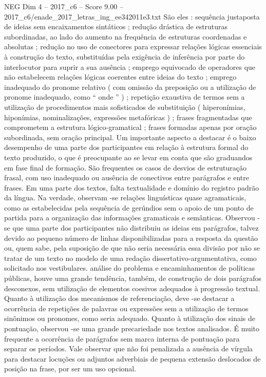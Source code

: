 \begin{textsample}{NEG Dim 4 – 2017\_c6 – Score 9.00 – 2017\_c6/enade\_2017\_letras\_ing\_ee342011e3.txt}
São eles : sequência justaposta de ideias sem encaixamentos sintáticos ; redução drástica de estruturas subordinadas, ao lado do aumento na frequência de estruturas coordenadas e absolutas ; redução no uso de conectores para expressar relações lógicas essenciais à construção do texto, substituídas pela exigência de inferência por parte do interlocutor para suprir a sua ausência ; emprego equivocado de operadores que não estabelecem relações lógicas coerentes entre ideias do texto ; emprego inadequado do pronome relativo ( com omissão da preposição ou a utilização de pronome inadequado, como “ onde ” ) ; repetição exaustiva de termos sem a utilização de procedimentos mais sofisticados de substituição ( hiperonímias, hiponímias, nominalizações, expressões metafóricas ) ; frases fragmentadas que comprometem a estrutura lógico-gramatical ; frases formadas apenas por oração subordinada, sem oração principal.
Um importante aspecto a destacar é o baixo desempenho de uma parte dos participantes em relação à estrutura formal do texto produzido, o que é preocupante ao se levar em conta que são graduandos em fase final de formação.
São frequentes os casos de desvios de estruturação frasal, com uso inadequado ou ausência de conectivos entre parágrafos e entre frases.
Em uma parte dos textos, falta textualidade e domínio do registro padrão da língua.
Na verdade, observam -se relações linguísticas quase agramaticais, como as estabelecidas pela sequência de gerúndios sem o apoio de um ponto de partida para a organização das informações gramaticais e semânticas.
Observou -se que uma parte dos participantes não distribuiu as ideias em parágrafos, talvez devido ao pequeno número de linhas disponibilizadas para a resposta da questão ou, quem sabe, pela suposição de que não seria necessária essa divisão por não se tratar de um texto no modelo de uma redação dissertativo-argumentativa, como solicitado nos vestibulares. análise do problema e encaminhamentos de políticas públicas, houve uma grande tendência, também, de construção de dois parágrafos desconexos, sem utilização de elementos coesivos adequados à progressão textual.
Quanto à utilização dos mecanismos de referenciação, deve -se destacar a ocorrência de repetições de palavras ou expressões sem a utilização de termos sinônimos ou pronomes, como seria adequado.
Quanto à utilização dos sinais de pontuação, observou -se uma grande precariedade nos textos analisados.
É muito frequente a ocorrência de parágrafos sem marca interna de pontuação para separar os períodos.
Vale observar que não foi penalizada a ausência de vírgula para destacar locuções ou adjuntos adverbiais de pequena extensão deslocados de posição na frase, por ser um uso opcional.

\end{textsample}
